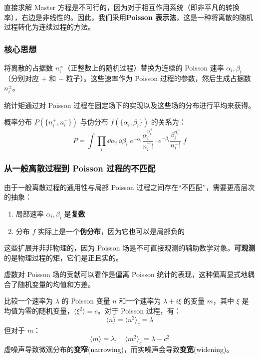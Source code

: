 直接求解 Master 方程是不可行的，因为对于相互作用系统（即非平凡的转换率），右边是非线性的。因此，我们采用\textbf{Poisson 表示法}\cite{gardiner1977}，这是一种将离散的随机过程转化为连续过程的方法。

\subsubsection{核心思想}

\begin{notebox}
将离散的占据数 $n_i^\pm$（正整数上的随机过程）替换为连续的 Poisson 速率 $\alpha_i, \beta_i$（分别对应 $+$ 和 $-$ 粒子）。这些速率作为 Poisson 过程的参数，然后生成占据数 $n_i^\pm$。

统计矩通过对 Poisson 过程在固定场下的实现以及这些场的分布进行平均来获得。
\end{notebox}

概率分布 $P(\{n_i^+, n_i^-\})$ 与伪分布 $f(\{\alpha_i, \beta_i\})$ 的关系为：
\begin{equation}\label{eq:poisson-rep}
\boxed{P = \int \prod_i \dd\alpha_i \, \dd\beta_i \; e^{-\alpha_i}\frac{\alpha_i^{n_i^+}}{n_i^+!} \cdot e^{-\beta_i}\frac{\beta_i^{n_i^-}}{n_i^-!} \; f}
\end{equation}

\subsubsection{从一般离散过程到 Poisson 过程的不匹配}

由于一般离散过程的通用性与局部 Poisson 过程之间存在``不匹配''，需要更高层次的抽象：
\begin{enumerate}
    \item 局部速率 $\alpha_i, \beta_i$ 是\textbf{复数}
    \item 分布 $f$ 实际上是一个\textbf{伪分布}，因为它也可以是局部负的
\end{enumerate}

这些扩展并非非物理的，因为 Poisson 场是不可直接观测的辅助数学对象。\textbf{可观测}的是物理过程的矩，它们是正且实的。

\begin{remark}[虚数的直观理解]
虚数对 Poisson 场的贡献可以看作是偏离 Poisson 统计的表现，这种偏离显式地耦合了随机变量的均值和方差。

比较一个速率为 $\lambda$ 的 Poisson 变量 $n$ 和一个速率为 $\lambda + i\xi$ 的变量 $m$，其中 $\xi$ 是均值为零的随机变量，$\langle \xi^2 \rangle = c$。对于 Poisson 过程，有：
\[
\langle n \rangle = \langle n^2 \rangle_c = \lambda
\]
但对于 $m$：
\[
\langle m \rangle = \lambda, \quad \langle m^2 \rangle_c = \lambda - c^2
\]
虚噪声导致微观分布的\textbf{变窄}(narrowing)，而实噪声会导致\textbf{变宽}(widening)。
\end{remark}

